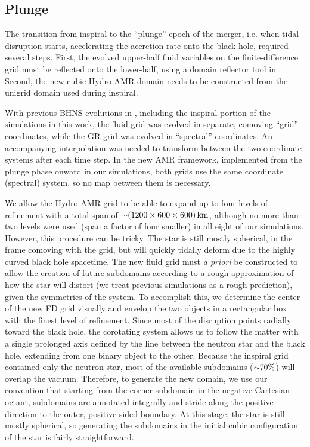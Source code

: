 \subsection{Plunge}  
The transition from inspiral to the ``plunge'' epoch of the merger, i.e. when tidal disruption starts, accelerating the accretion rate onto the black hole, required several steps.  First, the evolved upper-half fluid variables on the finite-difference grid must be reflected onto the lower-half, using a domain reflector tool in \SpEC.  Second, the new cubic Hydro-AMR domain needs to be constructed from the unigrid domain used during inspiral.

With previous BHNS evolutions in \SpEC, including the inspiral portion of the simulations in this work, the fluid grid was evolved in separate, comoving ``grid'' coordinates, while the GR grid was evolved in ``spectral'' coordinates.  An accompanying interpolation was needed to transform between the two coordinate systems after each time step.
In the new AMR framework, implemented from the plunge phase onward in our simulations, both grids use the same coordinate (spectral) system, so no map between them is necessary. 

We allow the Hydro-AMR grid to be able to expand up to four levels of refinement with a total span of $\mathord{\sim}(1200 \times 600 \times 600)\, \textrm{km}$, although no more than two levels were used (span a factor of four smaller) in all eight of our simulations.
However, this procedure can be tricky. 
The star is still mostly spherical, in the frame comoving with the grid, but will quickly tidally deform due to the highly curved black hole spacetime.
The new fluid grid must \textit{a priori} be constructed to allow the creation of future subdomains according to a rough approximation of how the star will distort (we treat previous simulations as a rough prediction), given the symmetries of the system.
To accomplish this, we determine the center of the new FD grid visually and envelop the two objects in a rectangular box with the finest level of refinement.  
Since most of the disruption points radially toward the black hole, the corotating system allows us to follow the matter with a single prolonged axis defined by the line between the neutron star and the black hole, extending from one binary object to the other.
Because the inspiral grid contained only the neutron star, most of the available subdomains ($\mathord{\sim} 70\%$) will overlap the vacuum.  
Therefore, to generate the new domain, we use our convention that starting from the corner subdomain in the negative Cartesian octant, subdomains are annotated integrally and stride along the positive direction to the outer, positive-sided boundary.
At this stage, the star is still mostly spherical, so generating the subdomains in the initial cubic configuration of the star is fairly straightforward.

